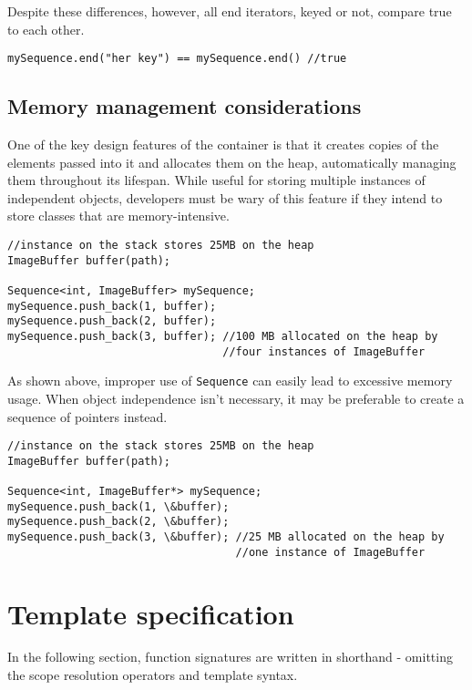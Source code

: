 ﻿\documentclass{article}
\begin{document}
Despite these differences, however, all end iterators, keyed or not, compare
true to each other.

\begin{verbatim}
mySequence.end("her key") == mySequence.end() //true
\end{verbatim}

\subsection{Memory management considerations}

One of the key design features of the container is that it creates copies
of the elements passed into it and allocates them on the heap, automatically
managing them throughout its lifespan. While useful for storing multiple
instances of independent objects, developers must be wary of this feature if
they intend to store classes that are memory-intensive.

\begin{verbatim}
//instance on the stack stores 25MB on the heap
ImageBuffer buffer(path);

Sequence<int, ImageBuffer> mySequence;
mySequence.push_back(1, buffer);
mySequence.push_back(2, buffer);
mySequence.push_back(3, buffer); //100 MB allocated on the heap by
                                 //four instances of ImageBuffer
\end{verbatim}

As shown above, improper use of {\tt Sequence} can easily lead to excessive
memory usage. When object independence isn't necessary, it may be preferable
to create a sequence of pointers instead.

\begin{verbatim}
//instance on the stack stores 25MB on the heap
ImageBuffer buffer(path);

Sequence<int, ImageBuffer*> mySequence;
mySequence.push_back(1, \&buffer);
mySequence.push_back(2, \&buffer);
mySequence.push_back(3, \&buffer); //25 MB allocated on the heap by
                                   //one instance of ImageBuffer
\end{verbatim}

\section{Template specification}

In the following section, function signatures are written in shorthand -
omitting the scope resolution operators and template syntax.
\end{document}
